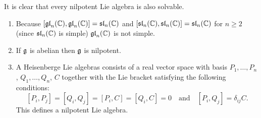It is clear that every nilpotent Lie algebra is also solvable.


\begin{expls}
 \begin{enumerate}
  \item
   Because $[\mathfrak{gl}_n(\mathbb{C}),\mathfrak{gl}_n(\mathbb{C})] = \mathfrak{sl}_n(\mathbb{C})$ and $[\mathfrak{sl}_n(\mathbb{C}),\mathfrak{sl}_n(\mathbb{C})] = \mathfrak{sl}_n(\mathbb{C})$ for $n \geq 2$ (since $\mathfrak{sl}_n(\mathbb{C})$ is simple) $\mathfrak{gl}_n(\mathbb{C})$ is not simple.
  \item
   If $\mathfrak{g}$ is abelian then $\mathfrak{g}$ is nilpotent.
  \item
   A Heisenberge Lie algebras consists of a real vector space with basis $P_1, \dotsc, P_n$, $Q_1, \dotsc, Q_n$, $C$ together with the Lie bracket satisfying the following conditions:
   \[
    [P_i, P_j] = [Q_i, Q_j] = [P_i, C] = [Q_i, C] = 0
    \quad \text{and} \quad
    [P_i, Q_j] = \delta_{ij} C.
   \]
   This defines a nilpotent Lie algebra.
 \end{enumerate}
\end{expls}



